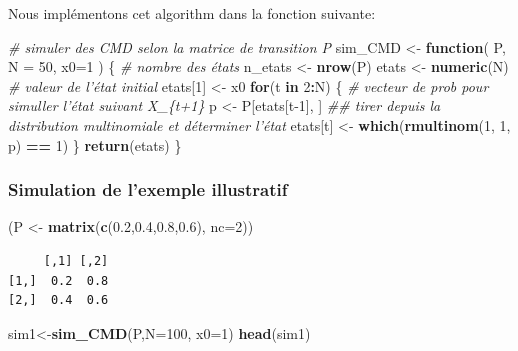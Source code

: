 \documentclass[
]{book}
\newenvironment{Shaded}{\begin{snugshade}}{\end{snugshade}}
\newcommand{\CommentTok}[1]{\textcolor[rgb]{0.56,0.35,0.01}{\textit{#1}}}
\newcommand{\ControlFlowTok}[1]{\textcolor[rgb]{0.13,0.29,0.53}{\textbf{#1}}}
\newcommand{\DataTypeTok}[1]{\textcolor[rgb]{0.13,0.29,0.53}{#1}}
\newcommand{\DecValTok}[1]{\textcolor[rgb]{0.00,0.00,0.81}{#1}}
\newcommand{\FloatTok}[1]{\textcolor[rgb]{0.00,0.00,0.81}{#1}}
\newcommand{\KeywordTok}[1]{\textcolor[rgb]{0.13,0.29,0.53}{\textbf{#1}}}
\newcommand{\NormalTok}[1]{#1}
\newcommand{\OperatorTok}[1]{\textcolor[rgb]{0.81,0.36,0.00}{\textbf{#1}}}
\newcommand{\StringTok}[1]{\textcolor[rgb]{0.31,0.60,0.02}{#1}}
\theoremstyle{definition}
\theoremstyle{definition}
\theoremstyle{definition}
\theoremstyle{remark}
\begin{document}
Nous implémentons cet algorithm dans la fonction suivante:

\begin{Shaded}
\begin{Highlighting}[]
\CommentTok{# simuler des CMD selon la matrice de transition P}
\NormalTok{sim_CMD <-}\StringTok{ }\ControlFlowTok{function}\NormalTok{( P, }\DataTypeTok{N =} \DecValTok{50}\NormalTok{, }\DataTypeTok{x0=}\DecValTok{1}\NormalTok{ ) \{}
  \CommentTok{# nombre des états}
\NormalTok{  n_etats <-}\StringTok{ }\KeywordTok{nrow}\NormalTok{(P)}
\NormalTok{  etats <-}\StringTok{ }\KeywordTok{numeric}\NormalTok{(N)}
  \CommentTok{# valeur de l'état initial }
\NormalTok{  etats[}\DecValTok{1}\NormalTok{] <-}\StringTok{ }\NormalTok{x0}
  \ControlFlowTok{for}\NormalTok{(t }\ControlFlowTok{in} \DecValTok{2}\OperatorTok{:}\NormalTok{N) \{}
    \CommentTok{# vecteur de prob pour simuller l'état suivant X_\{t+1\}}
\NormalTok{    p <-}\StringTok{ }\NormalTok{P[etats[t}\DecValTok{-1}\NormalTok{], ]}
    \CommentTok{## tirer depuis la distribution multinomiale et déterminer l'état}
\NormalTok{    etats[t] <-}\StringTok{ }\KeywordTok{which}\NormalTok{(}\KeywordTok{rmultinom}\NormalTok{(}\DecValTok{1}\NormalTok{, }\DecValTok{1}\NormalTok{, p) }\OperatorTok{==}\StringTok{ }\DecValTok{1}\NormalTok{)}
\NormalTok{  \}}
  \KeywordTok{return}\NormalTok{(etats)}
\NormalTok{\}}
\end{Highlighting}
\end{Shaded}

\hypertarget{simulation-de-lexemple-illustratif}{%
\subsubsection{Simulation de l'exemple illustratif}\label{simulation-de-lexemple-illustratif}}

\begin{Shaded}
\begin{Highlighting}[]
\NormalTok{(P <-}\StringTok{ }\KeywordTok{matrix}\NormalTok{(}\KeywordTok{c}\NormalTok{(}\FloatTok{0.2}\NormalTok{,}\FloatTok{0.4}\NormalTok{,}\FloatTok{0.8}\NormalTok{,}\FloatTok{0.6}\NormalTok{), }\DataTypeTok{nc=}\DecValTok{2}\NormalTok{))}
\end{Highlighting}
\end{Shaded}

\begin{verbatim}
     [,1] [,2]
[1,]  0.2  0.8
[2,]  0.4  0.6
\end{verbatim}

\begin{Shaded}
\begin{Highlighting}[]
\NormalTok{sim1<-}\KeywordTok{sim_CMD}\NormalTok{(P,}\DataTypeTok{N=}\DecValTok{100}\NormalTok{, }\DataTypeTok{x0=}\DecValTok{1}\NormalTok{)}
\KeywordTok{head}\NormalTok{(sim1)}
\end{Highlighting}
\end{Shaded}
\end{document}
